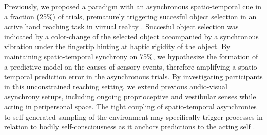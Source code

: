 Previously, we proposed a paradigm with an asynchronous spatio-temporal cue in a fraction (25\%) of trials, prematurely triggering succesful object selection in an active hand reaching task in virtual reality \cite{Gehrke2019}. Succesful object selection was indicated by a color-change of the selected object accompanied by a synchronous vibration under the fingertip hinting at haptic rigidity of the object. By maintaining spatio-temporal synchrony on 75\%, we hypothesize the formation of a predictive model on the causes of sensory events, therefore amplifying a spatio-temporal prediction error in the asynchronous trials. By investigating participants in this unconstrained reaching setting, we extend previous audio-visual asynchrony setups, including ongoing proprioceptive and vestibular senses while acting in peripersonal space. The tight coupling of spatio-temporal asynchronies to self-generated sampling of the environment may specifically trigger processes in relation to bodily self-consciousness as it anchors predictions to the acting self \cite{Blanke2015, Guterstam2015a}. 








































